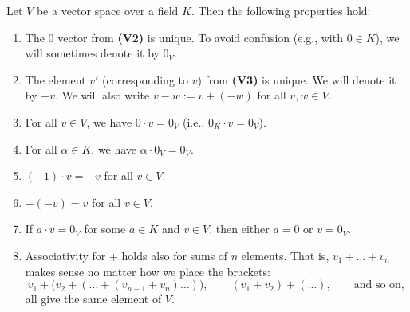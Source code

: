 \begin{lemma}
\label{lem:vector_space_basics}
Let $V$ be a vector space over a field $K$. Then the following properties hold:
\begin{enumerate}[label=\textbf{(\alph*)}]
    \item The $0$ vector from \textbf{(V2)} is unique. To avoid confusion (e.g., with $0 \in K$), we will sometimes denote it by $0_V$.
    \item The element $v'$ (corresponding to $v$) from \textbf{(V3)} is unique. We will denote it by $-v$. We will also write $v - w := v + (-w)$ for all $v, w \in V$.
    \item For all $v \in V$, we have $0 \cdot v = 0_V$ (i.e., $0_K \cdot v = 0_V$).
    \item For all $\alpha \in K$, we have $\alpha \cdot 0_V = 0_V$.
    \item $(-1) \cdot v = -v$ for all $v \in V$.
    \item $-(-v) = v$ for all $v \in V$.
    \item If $a \cdot v = 0_V$ for some $a \in K$ and $v \in V$, then either $a = 0$ or $v = 0_V$.
    \item Associativity for $+$ holds also for sums of $n$ elements. That is, $v_1 + \dots + v_n$ makes sense no matter how we place the brackets:
    \[
    v_1 + \bigl(v_2 + (\dots + (v_{n-1} + v_n) \dots)\bigr),
    \qquad
    (v_1 + v_2) + (\dots), \qquad \text{and so on},
    \]
    all give the same element of $V$.
\end{enumerate}
\end{lemma}

